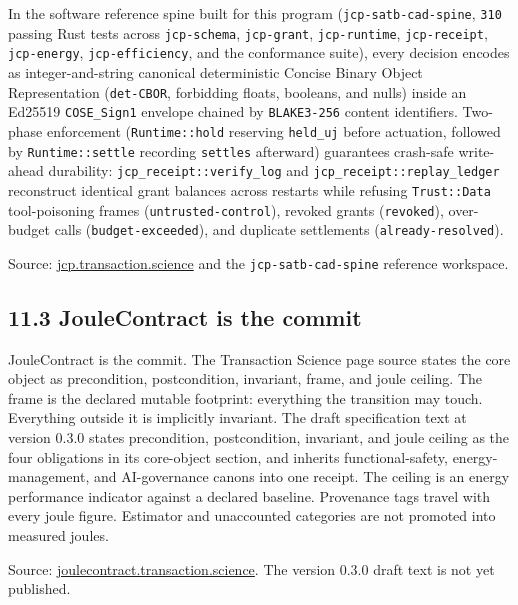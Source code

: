 \documentclass[10pt,letterpaper]{article}
\begin{document}
In the software reference spine built for this program
(\texttt{jcp-\allowbreak{}satb-\allowbreak{}cad-\allowbreak{}spine}, \texttt{310} passing Rust tests across
\texttt{jcp-schema}, \texttt{jcp-grant}, \texttt{jcp-runtime},
\texttt{jcp-receipt}, \texttt{jcp-energy}, \texttt{jcp-efficiency}, and
the conformance suite), every decision encodes as integer-and-string
canonical deterministic Concise Binary Object Representation
(\texttt{det-CBOR}, forbidding floats, booleans, and nulls) inside an
Ed25519 \texttt{COSE\_Sign1} envelope chained by \texttt{BLAKE3-256}
content identifiers. Two-phase enforcement (\texttt{Runtime::hold}
reserving \texttt{held\_uj} before actuation, followed by
\texttt{Runtime::settle} recording \texttt{settles} afterward)
guarantees crash-safe write-ahead durability:
\texttt{jcp\_\allowbreak{}receipt::verify\_\allowbreak{}log} and
\texttt{jcp\_\allowbreak{}receipt::replay\_\allowbreak{}ledger} reconstruct identical grant
balances across restarts while refusing \texttt{Trust::Data}
tool-poisoning frames (\texttt{untrusted-\allowbreak{}control}), revoked grants
(\texttt{revoked}), over-budget calls (\texttt{budget-exceeded}), and
duplicate settlements (\texttt{already-\allowbreak{}resolved}).

Source: \href{https://jcp.transaction.science/}{jcp.transaction.science}
and the \texttt{jcp-\allowbreak{}satb-\allowbreak{}cad-\allowbreak{}spine} reference workspace.

\subsection{11.3 JouleContract is the
commit}\label{joulecontract-is-the-commit}

JouleContract is the commit. The Transaction Science page source states
the core object as precondition, postcondition, invariant, frame, and
joule ceiling. The frame is the declared mutable footprint: everything
the transition may touch. Everything outside it is implicitly invariant.
The draft specification text at version 0.3.0 states precondition,
postcondition, invariant, and joule ceiling as the four obligations in
its core-object section, and inherits functional-safety,
energy-management, and AI-governance canons into one receipt. The
ceiling is an energy performance indicator against a declared baseline.
Provenance tags travel with every joule figure. Estimator and
unaccounted categories are not promoted into measured joules.

Source:
\href{https://joulecontract.transaction.science/}{joulecontract.transaction.science}.
The version 0.3.0 draft text is not yet published.
\end{document}

